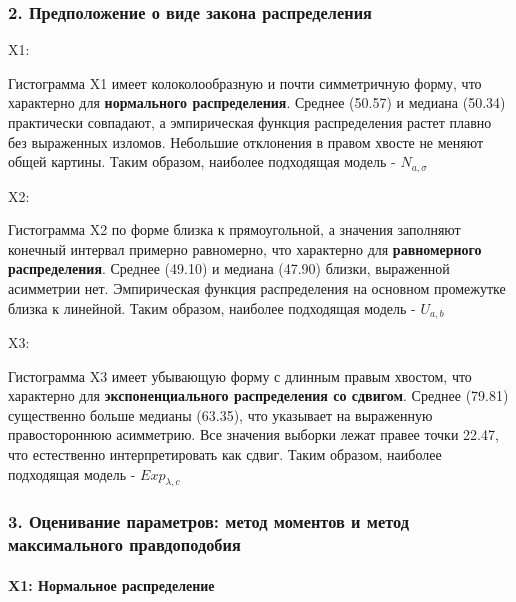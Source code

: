 \documentclass[11pt]{article}
\begin{document}
    \subsubsection{2. Предположение о виде закона
распределения}\label{ux43fux440ux435ux434ux43fux43eux43bux43eux436ux435ux43dux438ux435-ux43e-ux432ux438ux434ux435-ux437ux430ux43aux43eux43dux430-ux440ux430ux441ux43fux440ux435ux434ux435ux43bux435ux43dux438ux44f}

    X1:

Гистограмма X1 имеет колоколообразную и почти симметричную форму, что
характерно для \textbf{нормального распределения}. Среднее (50.57) и
медиана (50.34) практически совпадают, а эмпирическая функция
распределения растет плавно без выраженных изломов. Небольшие отклонения
в правом хвосте не меняют общей картины. Таким образом, наиболее
подходящая модель - \(N_{a,\sigma}\)

X2:

Гистограмма X2 по форме близка к прямоугольной, а значения заполняют
конечный интервал примерно равномерно, что характерно для
\textbf{равномерного распределения}. Среднее (49.10) и медиана (47.90)
близки, выраженной асимметрии нет. Эмпирическая функция распределения на
основном промежутке близка к линейной. Таким образом, наиболее
подходящая модель - \(U_{a, b}\)

X3:

Гистограмма X3 имеет убывающую форму с длинным правым хвостом, что
характерно для \textbf{экспоненциального распределения со сдвигом}.
Среднее (79.81) существенно больше медианы (63.35), что указывает на
выраженную правостороннюю асимметрию. Все значения выборки лежат правее
точки 22.47, что естественно интерпретировать как сдвиг. Таким образом,
наиболее подходящая модель - \(Exp_{\lambda,c}\)

    \subsubsection{3. Оценивание параметров: метод моментов и метод
максимального
правдоподобия}\label{ux43eux446ux435ux43dux438ux432ux430ux43dux438ux435-ux43fux430ux440ux430ux43cux435ux442ux440ux43eux432-ux43cux435ux442ux43eux434-ux43cux43eux43cux435ux43dux442ux43eux432-ux438-ux43cux435ux442ux43eux434-ux43cux430ux43aux441ux438ux43cux430ux43bux44cux43dux43eux433ux43e-ux43fux440ux430ux432ux434ux43eux43fux43eux434ux43eux431ux438ux44f}

    \paragraph{X1: Нормальное
распределение}\label{x1-ux43dux43eux440ux43cux430ux43bux44cux43dux43eux435-ux440ux430ux441ux43fux440ux435ux434ux435ux43bux435ux43dux438ux435}
\end{document}
